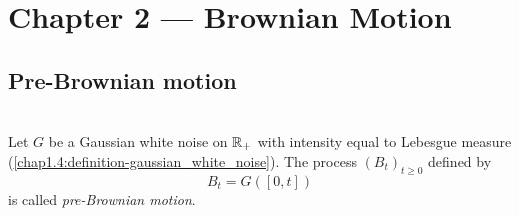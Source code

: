\section{Chapter 2 --- Brownian Motion}

\subsection{Pre-Brownian motion}
\begin{definition} \label{chap2.1:definition-pre_brownian_motion}  \\
Let $G$ be a Gaussian white noise on $\mathbb{R}_+$ with intensity equal to Lebesgue measure (\cref{chap1.4:definition-gaussian_white_noise}). The process $(B_t)_{t\ge0}$ defined by
$$B_t=G([0,t])$$
is called \textit{pre-Brownian motion}.
\end{definition}

